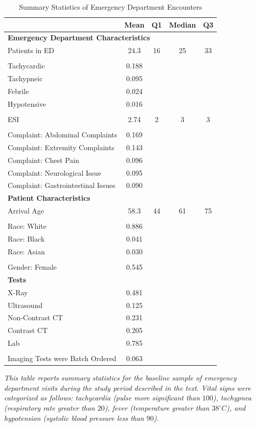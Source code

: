 \documentclass[,,nonblindrev]{informs}
\begin{document}
\begin{table}[ht]
\centering
\caption{Summary Statistics of Emergency Department Encounters}
\label{tab:summary_statistics}
\begin{tabular}{p{10.5cm}cccc}
\toprule
\textbf{} & \textbf{Mean} & \textbf{Q1} & \textbf{Median} & \textbf{Q3} \\
\midrule
\multicolumn{5}{l}{\textbf{Emergency Department Characteristics}} \\
Patients in ED & 24.3 & 16 & 25 & 33 \\
\\
Tachycardic & 0.188 & & & \\
Tachypneic & 0.095 & & & \\
Febrile & 0.024 & & & \\
Hypotensive & 0.016 & & & \\
\\
ESI & 2.74 & 2 & 3 & 3 \\
\\
Complaint: Abdominal Complaints & 0.169 & & & \\
Complaint: Extremity Complaints & 0.143 & & & \\
Complaint: Chest Pain & 0.096 & & & \\
Complaint: Neurological Issue & 0.095 & & & \\
Complaint: Gastrointestinal Issues & 0.090 & & & \\
\midrule
\multicolumn{5}{l}{\textbf{Patient Characteristics}} \\
Arrival Age & 58.3 & 44 & 61 & 75 \\
\\
Race: White & 0.886 & & & \\
Race: Black & 0.041 & & & \\
Race: Asian & 0.030 & & & \\
\\
Gender: Female & 0.545 & & & \\
\midrule
\multicolumn{5}{l}{\textbf{Tests}} \\
X-Ray & 0.481 & & & \\
Ultrasound & 0.125 & & & \\
Non-Contrast CT & 0.231 & & & \\
Contrast CT & 0.205 & & & \\
Lab & 0.785 & & & \\
\\
Imaging Tests were Batch Ordered & 0.063 & & & \\
\bottomrule
\end{tabular}
\begin{tablenotes}
\small
\item \textit{This table reports summary statistics for the baseline sample of emergency department visits during the study period described in the text. Vital signs were categorized as follows: tachycardia (pulse more significant than $100$), tachypnea (respiratory rate greater than $20$), fever (temperature greater than $38^\circ C$), and hypotension (systolic blood pressure less than $90$).}
\end{tablenotes}
\end{table}
\end{document}
